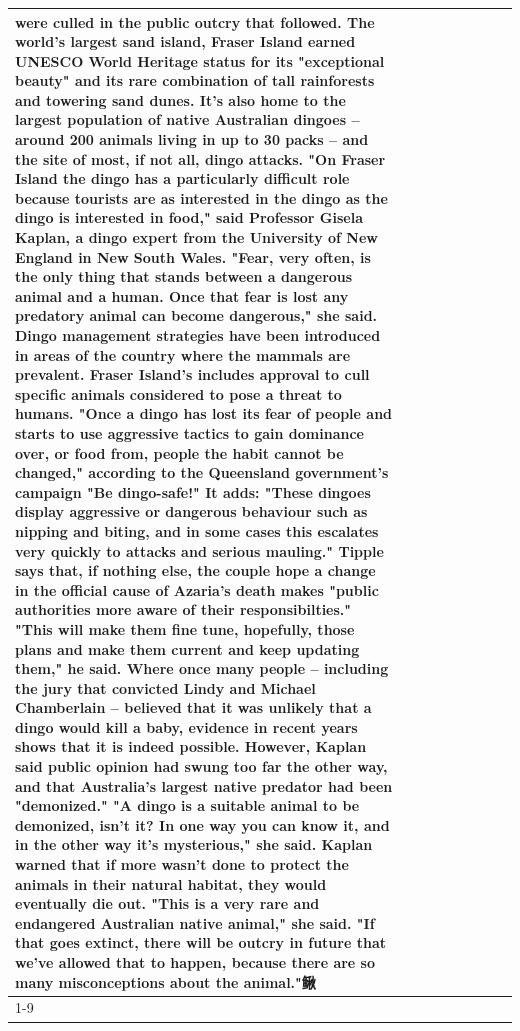 \begin{table}[H]
\begin{tabular}{lllrlllll}
were culled in the public outcry that followed. The world's largest sand island, Fraser Island earned UNESCO World Heritage status for its "exceptional beauty" and its rare combination of tall rainforests and towering sand dunes. It's also home to the largest population of native Australian dingoes -- around 200 animals living in up to 30 packs -- and the site of most, if not all, dingo attacks. "On Fraser Island the dingo has a particularly difficult role because tourists are as interested in the dingo as the dingo is interested in food," said Professor Gisela Kaplan, a dingo expert from the University of New England in New South Wales. "Fear, very often, is the only thing that stands between a dangerous animal and a human. Once that fear is lost any predatory animal can become dangerous," she said. Dingo management strategies have been introduced in areas of the country where the mammals are prevalent. Fraser Island's includes approval to cull specific animals considered to pose a threat to humans. "Once a dingo has lost its fear of people and starts to use aggressive tactics to gain dominance over, or food from, people the habit cannot be changed," according to the Queensland government's campaign "Be dingo-safe!" It adds: "These dingoes display aggressive or dangerous behaviour such as nipping and biting, and in some cases this escalates very quickly to attacks and serious mauling." Tipple says that, if nothing else, the couple hope a change in the official cause of Azaria's death makes "public authorities more aware of their responsibilties." "This will make them fine tune, hopefully, those plans and make them current and keep updating them," he said. Where once many people -- including the jury that convicted Lindy and Michael Chamberlain -- believed that it was unlikely that a dingo would kill a baby, evidence in recent years shows that it is indeed possible. However, Kaplan said public opinion had swung too far the other way, and that Australia's largest native predator had been "demonized." "A dingo is a suitable animal to be demonized, isn't it? In one way you can know it, and in the other way it's mysterious," she said. Kaplan warned that if more wasn't done to protect the animals in their natural habitat, they would eventually die out. "This is a very rare and endangered Australian native animal," she said. "If that goes extinct, there will be outcry in future that we've allowed that to happen, because there are so many misconceptions about the animal."鳅 \\
\cline{1-9}

\end{tabular}
\end{table}
